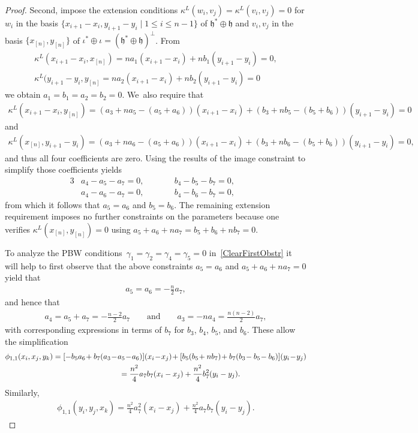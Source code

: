 \documentclass[pdftex]{sigma}
\numberwithin{equation}{section}
\begin{document}
\begin{proof}
Second, impose the extension conditions $\kappa^L(w_i,v_j)=\kappa^L(v_i,v_j)=0$ for
$w_i$ in the basis $\{x_{i+1}-x_i, y_{i+1}-y_i \mid 1 \leq i \leq n-1 \}$
of $\mathfrak{h}^*\oplus\mathfrak{h}$ and $v_i, v_j$ in the basis $\{x_{[n]},y_{[n]}\}$
of $\iota^* \oplus \iota=(\mathfrak{h}^*\oplus\mathfrak{h})^\perp$. From
\begin{gather*}
\kappa^L(x_{i+1}-x_i,x_{[n]})=na_1(x_{i+1}-x_i)+nb_1(y_{i+1}-y_i)=0,
\\
\kappa^L(y_{i+1}-y_i,y_{[n]}=na_2(x_{i+1}-x_i)+nb_2(y_{i+1}-y_i)=0
\end{gather*}
we obtain $a_1=b_1=a_2=b_2=0$. We~also require that
\begin{gather*}
\kappa^L(x_{i+1}\!-x_i,y_{[n]})=(a_3\!+na_5\!-(a_5\!+a_6))(x_{i+1}\!-x_i)
\!+(b_3\!+nb_5\!-(b_5\!+b_6))(y_{i+1}\!-y_i)=0
\end{gather*}
and
\begin{gather*}
\kappa^L(x_{[n]},y_{i+1}\!-y_i)=(a_3\!+na_6\!-(a_5\!+a_6))(x_{i+1}\!-x_i)
\!+(b_3\!+nb_6\!-(b_5\!+b_6))(y_{i+1}\!-y_i)=0,
\end{gather*}
and thus all four coefficients are zero. Using the results of the image constraint
to simplify those coefficients yields
\begin{alignat*}{3}
&a_4-a_5-a_7=0,\qquad&& b_4-b_5-b_7=0,& \\
&a_4-a_6-a_7=0,\qquad && b_4-b_6-b_7=0,&
\end{alignat*}
from which it follows that $a_5=a_6$ and $b_5=b_6$.
The remaining extension requirement imposes no further constraints on the parameters because
one verifies $\kappa^L(x_{[n]},y_{[n]})=0$ using $a_5+a_6+na_7=b_5+b_6+nb_7=0$.

To analyze the PBW conditions~$\gamma_1=\gamma_2=\gamma_4=\gamma_5=0$ in~\eqref{ClearFirstObstr}
it will help to first observe that the above constraints $a_5=a_6$ and $a_5+a_6+na_7=0$
yield that
\begin{gather*}
a_5=a_6=-\frac{n}{2}a_7,
\end{gather*}
and hence that
\begin{gather*}
a_4=a_5+a_7=-\frac{n-2}{2} a_7\qquad \text{and} \qquad
a_3=-na_4=\frac{n(n-2)}{2}a_7,
\end{gather*}
with corresponding expressions in terms of $b_7$ for $b_3$, $b_4$, $b_5$, and $b_6$.
These allow the simplification
\begin{gather*}
\phi_{1,1}(x_i,x_j,y_k)
=[-b_5a_6\!+b_7(a_3\!-\!a_5\!-\!a_6)](x_i\!-\!x_j)\!+[b_5(b_5\!+nb_7)\!+b_7(b_3\!-b_5\!-b_6)](y_i\!-\!y_j)
\\ \hphantom{\phi_{1,1}(x_i,x_j,y_k)}
{}=\frac{n^2}{4}a_7b_7(x_i-x_j)+\frac{n^2}{4}b_7^2(y_i-y_j).
\end{gather*}
Similarly,
\begin{gather*}
\phi_{1,1}(y_i,y_j,x_k)=\frac{n^2}{4}a_7^2(x_i-x_j)+\frac{n^2}{4}a_7b_7(y_i-y_j).
\end{gather*}


\end{proof}
\end{document}
